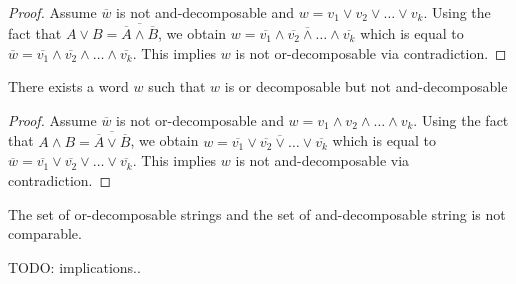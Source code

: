 \begin{proof}
	Assume $\overbar{w}$ is not and-decomposable and $w = v_1 \lor v_2 \lor \dots \lor v_k$.
	Using the fact that $A \lor B = \overbar{\overbar{A} \land \overbar{B}}$, we obtain $w = \overbar{\overbar{v_1} \land \overbar{v_2} \land \dots \land \overbar{v_k}}$ which is equal to $\overbar{w} = \overbar{v_1} \land \overbar{v_2} \land \dots \land \overbar{v_k}$.
	This implies $w$ is not or-decomposable via contradiction.
\end{proof}


\begin{theorem}
	There exists a word $w$ such that $w$ is or decomposable but not and-decomposable
\end{theorem}

\begin{proof}
	Assume $\overbar{w}$ is not or-decomposable and $w = v_1 \land v_2 \land \dots \land v_k$.
	Using the fact  that $A \land B = \overbar{\overbar{A} \lor \overbar{B}}$, we obtain $w = \overbar{\overbar{v_1} \lor \overbar{v_2} \lor \dots \lor \overbar{v_k}}$ which is equal to $\overbar{w} = \overbar{v_1} \lor \overbar{v_2} \lor \dots \lor \overbar{v_k}$.
	This implies $w$ is not and-decomposable via contradiction.
\end{proof}

\begin{corollary}
	The set of or-decomposable strings and the set of and-decomposable string is not comparable.
\end{corollary}


TODO: implications..


